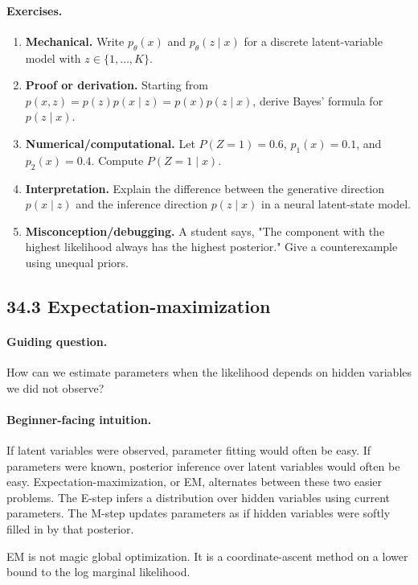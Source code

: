 \paragraph{Exercises.}
\begin{enumerate}[label=\textbf{34.2.\arabic*.}, leftmargin=*]
\item \textbf{Mechanical.} Write \(p_\theta(x)\) and \(p_\theta(z\mid x)\) for a discrete latent-variable model with \(z\in\{1,\ldots,K\}\).
\item \textbf{Proof or derivation.} Starting from \(p(x,z)=p(z)p(x\mid z)=p(x)p(z\mid x)\), derive Bayes' formula for \(p(z\mid x)\).
\item \textbf{Numerical/computational.} Let \(P(Z=1)=0.6\), \(p_1(x)=0.1\), and \(p_2(x)=0.4\). Compute \(P(Z=1\mid x)\).
\item \textbf{Interpretation.} Explain the difference between the generative direction \(p(x\mid z)\) and the inference direction \(p(z\mid x)\) in a neural latent-state model.
\item \textbf{Misconception/debugging.} A student says, "The component with the highest likelihood always has the highest posterior." Give a counterexample using unequal priors.
\end{enumerate}

\subsection{34.3 Expectation-maximization}

\paragraph{Guiding question.}
How can we estimate parameters when the likelihood depends on hidden variables we did not observe?

\paragraph{Beginner-facing intuition.}
If latent variables were observed, parameter fitting would often be easy. If parameters were known, posterior inference over latent variables would often be easy. Expectation-maximization, or EM, alternates between these two easier problems. The E-step infers a distribution over hidden variables using current parameters. The M-step updates parameters as if hidden variables were softly filled in by that posterior.

EM is not magic global optimization. It is a coordinate-ascent method on a lower bound to the log marginal likelihood.

